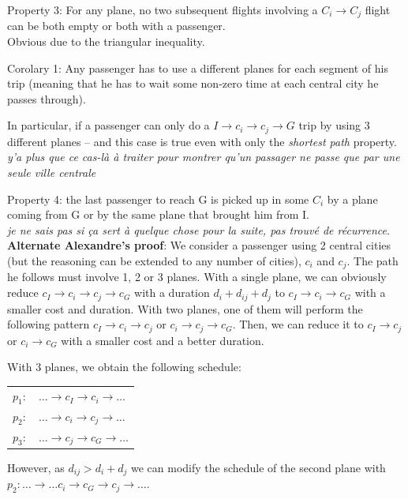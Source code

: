 \documentclass{llncs}
\begin{document}
Property 3: For any plane, no two subsequent flights involving a $C_i \rightarrow C_j$ flight can be both empty or both with a passenger.\\
Obvious due to the triangular inequality.

Corolary 1: Any passenger has to use a different planes for each segment of his trip (meaning that he has to wait some non-zero time at each central city he passes through).

In particular, if a passenger can only do a $I \rightarrow c_i \rightarrow c_j \rightarrow G$ trip by using 3 different planes -- and this case is true even with only the {\em shortest path} property.\\
{\em y'a plus que ce cas-l\`a \`a traiter pour montrer qu'un passager ne passe que par une seule ville centrale}
 
Property 4: the last passenger to reach G is picked up in some $C_i$ by a plane coming from G or by the same plane that brought him from I.\\
{\em je ne sais pas si \c{c}a sert \`a quelque chose pour la suite, pas trouv\'e de r\'ecurrence}.\\


{\bf Alternate Alexandre's proof}:
We consider a passenger using 2 central cities (but the reasoning can be extended to any number of cities), $c_i$ and $c_j$. The path he follows must involve 1, 2 or 3 planes. With a single plane, we can obviously reduce $c_I \to c_i \to c_j \to c_G$ with a duration $d_i+d_{ij}+d_j$ to $c_I \to c_i \to c_G$ with a smaller cost and duration.
With two planes, one of them will perform the following pattern $c_I \to c_i \to c_j$ or $c_i \to c_j \to c_G$. Then, we can reduce it to $c_I \to c_j$ or $c_i \to c_G$ with a smaller cost and a better duration.

With 3 planes, we obtain the following schedule:

\begin{center}
\begin{tabular}{c l}
    $p_1:$ & $\ldots \to c_I \to c_i \to \ldots$\\
    $p_2:$ & $\ldots \to c_i \to c_j \to \ldots$\\
    $p_3:$ & $\ldots \to c_j \to c_G \to \ldots$\\
\end{tabular}
\end{center}

However, as $d_{ij} > d_i + d_j$ we can modify the schedule of the second plane with $p_2: \ldots \to \ldots c_i \to c_G \to c_j \to \ldots$.
\end{document}
